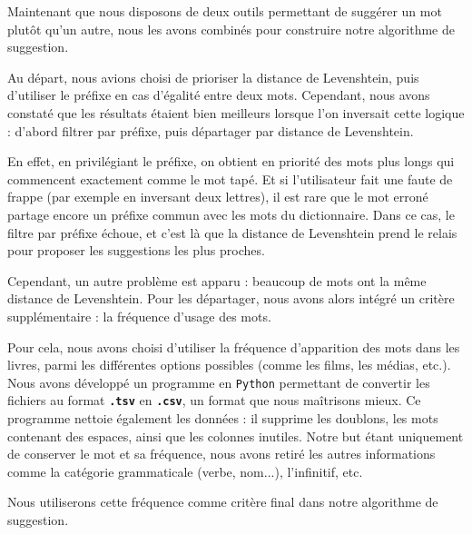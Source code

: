 \documentclass[a4paper, 11pt]{report}
\newcommand{\var}[1]{\texttt{\textbf{#1}}}
\newcommand{\langage}[1]{\texttt{#1}}
\begin{document}
{Maintenant que nous disposons de deux outils permettant de suggérer un mot plutôt qu’un autre, nous les avons combinés pour construire notre algorithme de suggestion.

Au départ, nous avions choisi de prioriser la distance de Levenshtein, puis d'utiliser le préfixe en cas d’égalité entre deux mots. Cependant, nous avons constaté que les résultats étaient bien meilleurs lorsque l’on inversait cette logique : d’abord filtrer par préfixe, puis départager par distance de Levenshtein.

En effet, en privilégiant le préfixe, on obtient en priorité des mots plus longs qui commencent exactement comme le mot tapé. Et si l'utilisateur fait une faute de frappe (par exemple en inversant deux lettres), il est rare que le mot erroné partage encore un préfixe commun avec les mots du dictionnaire. Dans ce cas, le filtre par préfixe échoue, et c’est là que la distance de Levenshtein prend le relais pour proposer les suggestions les plus proches.

Cependant, un autre problème est apparu : beaucoup de mots ont la même distance de Levenshtein. Pour les départager, nous avons alors intégré un critère supplémentaire : la fréquence d’usage des mots.

Pour cela, nous avons choisi d’utiliser la fréquence d’apparition des mots dans les livres, parmi les différentes options possibles (comme les films, les médias, etc.). Nous avons développé un programme en \langage{Python} permettant de convertir les fichiers au format \var{.tsv} en \var{.csv}, un format que nous maîtrisons mieux. Ce programme nettoie également les données : il supprime les doublons, les mots contenant des espaces, ainsi que les colonnes inutiles. Notre but étant uniquement de conserver le mot et sa fréquence, nous avons retiré les autres informations comme la catégorie grammaticale (verbe, nom...), l’infinitif, etc.

Nous utiliserons cette fréquence comme critère final dans notre algorithme de suggestion.



}
\end{document}
